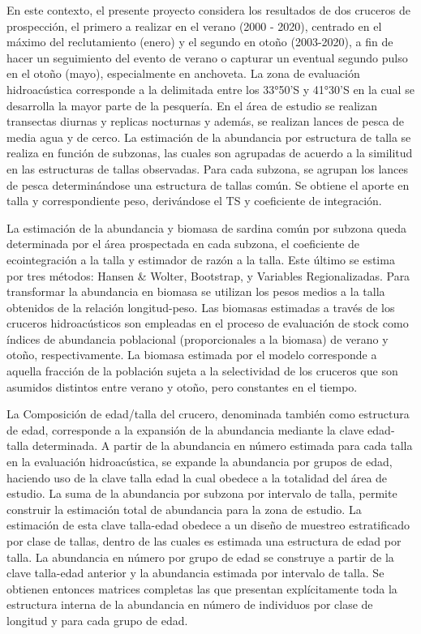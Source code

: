 \documentclass[
  spanish,
]{article}
\begin{document}
En este contexto, el presente proyecto considera los resultados de dos
cruceros de prospección, el primero a realizar en el verano (2000 -
2020), centrado en el máximo del reclutamiento (enero) y el segundo en
otoño (2003-2020), a fin de hacer un seguimiento del evento de verano o
capturar un eventual segundo pulso en el otoño (mayo), especialmente en
anchoveta. La zona de evaluación hidroacústica corresponde a la
delimitada entre los 33°50'S y 41°30'S en la cual se desarrolla la mayor
parte de la pesquería. En el área de estudio se realizan transectas
diurnas y replicas nocturnas y además, se realizan lances de pesca de
media agua y de cerco. La estimación de la abundancia por estructura de
talla se realiza en función de subzonas, las cuales son agrupadas de
acuerdo a la similitud en las estructuras de tallas observadas. Para
cada subzona, se agrupan los lances de pesca determinándose una
estructura de tallas común. Se obtiene el aporte en talla y
correspondiente peso, derivándose el TS y coeficiente de integración.

La estimación de la abundancia y biomasa de sardina común por subzona
queda determinada por el área prospectada en cada subzona, el
coeficiente de ecointegración a la talla y estimador de razón a la
talla. Este último se estima por tres métodos: Hansen \& Wolter,
Bootstrap, y Variables Regionalizadas. Para transformar la abundancia en
biomasa se utilizan los pesos medios a la talla obtenidos de la relación
longitud-peso. Las biomasas estimadas a través de los cruceros
hidroacústicos son empleadas en el proceso de evaluación de stock como
índices de abundancia poblacional (proporcionales a la biomasa) de
verano y otoño, respectivamente. La biomasa estimada por el modelo
corresponde a aquella fracción de la población sujeta a la selectividad
de los cruceros que son asumidos distintos entre verano y otoño, pero
constantes en el tiempo.

La Composición de edad/talla del crucero, denominada también como
estructura de edad, corresponde a la expansión de la abundancia mediante
la clave edad-talla determinada. A partir de la abundancia en número
estimada para cada talla en la evaluación hidroacústica, se expande la
abundancia por grupos de edad, haciendo uso de la clave talla edad la
cual obedece a la totalidad del área de estudio. La suma de la
abundancia por subzona por intervalo de talla, permite construir la
estimación total de abundancia para la zona de estudio. La estimación de
esta clave talla-edad obedece a un diseño de muestreo estratificado por
clase de tallas, dentro de las cuales es estimada una estructura de edad
por talla. La abundancia en número por grupo de edad se construye a
partir de la clave talla-edad anterior y la abundancia estimada por
intervalo de talla. Se obtienen entonces matrices completas las que
presentan explícitamente toda la estructura interna de la abundancia en
número de individuos por clase de longitud y para cada grupo de edad.
\end{document}
